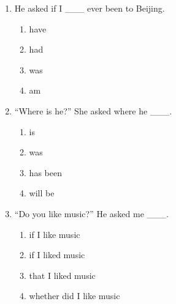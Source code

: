 \documentclass[11pt,a4paper]{ctexart}
\begin{document}
\begin{enumerate}[leftmargin=*,itemsep=4pt]
\begin{enumerate}[label=\Alph*.,leftmargin=2em,itemsep=1pt,topsep=2pt]
\item have
\end{enumerate}
\item He asked if I \_\_\_ ever been to Beijing.
\begin{enumerate}[label=\Alph*.,leftmargin=2em,itemsep=1pt,topsep=2pt]
\item have
\item had
\item was
\item am
\end{enumerate}
\item “Where is he?” She asked where he \_\_\_.
\begin{enumerate}[label=\Alph*.,leftmargin=2em,itemsep=1pt,topsep=2pt]
\item is
\item was
\item has been
\item will be
\end{enumerate}
\item “Do you like music?” He asked me \_\_\_.
\begin{enumerate}[label=\Alph*.,leftmargin=2em,itemsep=1pt,topsep=2pt]
\item if I like music
\item if I liked music
\item that I liked music
\item whether did I like music
\end{enumerate}
\end{enumerate}
\end{document}

